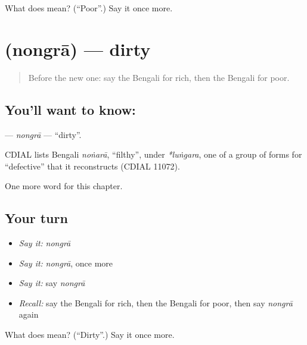 \begin{tcolorbox}[breakable,colback=teal!4,colframe=teal!35!black,title={Before you move on}]
What does  mean? (\textquotedblleft{}Poor\textquotedblright{}.) Say it once more.
\end{tcolorbox}
\section[\texorpdfstring{\bn{নোংরা} (nongrā)}{নোংরা (nongrā)}]{ (nongrā) — dirty}

\label{lesson:BN-C75-nongra}



\begin{quote}
Before the new one: say the Bengali for rich, then the Bengali for poor.
\end{quote}

\subsection*{You'll want to know: }
\textbf{} — \emph{nongrā} — \textquotedblleft{}dirty\textquotedblright{}.

\begin{cousinweb}
CDIAL lists Bengali \emph{noṅarā}, \textquotedblleft{}filthy\textquotedblright{}, under \emph{*luṅgara}, one of a group of forms for \textquotedblleft{}defective\textquotedblright{} that it reconstructs (CDIAL 11072).
\end{cousinweb}

\begin{grammarlens}[title={What you've built}]
One more word for this chapter.
\end{grammarlens}

\subsection*{Your turn}
\begin{itemize}
\raggedright
  \item \emph{Say it:} \emph{nongrā}
  \item \emph{Say it:} \emph{nongrā}, once more
  \item \emph{Say it:} say \emph{nongrā}
  \item \emph{Recall:} say the Bengali for rich, then the Bengali for poor, then say \emph{nongrā} again
\end{itemize}

\begin{tcolorbox}[breakable,colback=teal!4,colframe=teal!35!black,title={Before you move on}]
What does  mean? (\textquotedblleft{}Dirty\textquotedblright{}.) Say it once more.
\end{tcolorbox}
